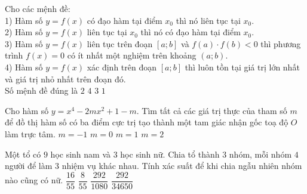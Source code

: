 \begin{ex}%
Cho các mệnh đề:\\
1) Hàm số $ y=f(x) $ có đạo hàm tại điểm $x_0 $ thì nó liên tục tại $ x_0 $.\\
2) Hàm số $ y=f(x) $ liên tục tại $ x_0 $ thì nó có đạo hàm tại điểm $ x_0 $.\\
3) Hàm số $ y=f(x) $ liên tục trên đoạn $ [a;b] $ và $ f(a)\cdot f(b) <0 $ thì phương trình $ f(x)=0 $ có ít nhất một nghiệm trên khoảng $ (a;b) $.\\
4) Hàm số $ y=f(x) $ xác định trên đoạn $ [a;b] $ thì luôn tồn tại giá trị lớn nhất và giá trị nhỏ nhất trên đoạn đó.\\
Số mệnh đề đúng là 	
	\choice
	{\True $ 2 $}
	{$ 4 $}
	{$ 3 $}
	{$ 1 $}
\end{ex}
\begin{ex}%
Cho hàm số $ y=x^4-2mx^2+1-m $. Tìm tất cả các giá trị thực của tham số $ m $	để đồ thị hàm số có ba điểm cực trị tạo thành một tam giác nhận gốc toạ độ $ O $ làm trực tâm.
	\choice
	{$ m=-1 $}
	{$ m=0 $}
	{\True $ m=1 $}
	{$ m=2 $}
\end{ex}
\begin{ex}%
Một tổ có $ 9 $ học sinh nam và $ 3 $ học sinh nữ. Chia tổ thành $ 3 $ nhóm, mỗi nhóm $ 4 $ người để làm $ 3 $ nhiệm vụ khác nhau. Tính xác suất để khi chia ngẫu nhiên nhóm nào cũng có nữ.	
	\choice
	{\True $ \dfrac{16}{55} $}
	{$ \dfrac{8}{55} $}
	{$ \dfrac{292}{1080} $}
	{$ \dfrac{292}{34650} $}
\end{ex}
